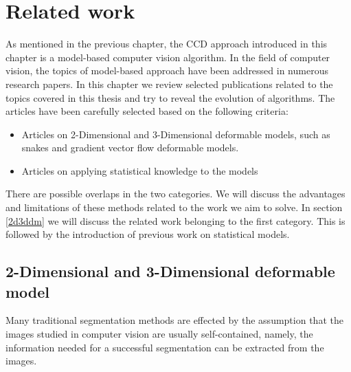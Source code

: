 \chapter{Related work}
\label{chapter:related}

As mentioned in the previous chapter, the
CCD approach introduced in this chapter is a model-based computer
vision algorithm. In the field of
computer vision, the topics of model-based approach have been addressed in numerous research papers.
In this chapter we review selected publications related to the topics
covered in this thesis and try to reveal the evolution of algorithms. The
articles have been carefully selected based on the following criteria:
\begin{itemize}
\item Articles on 2-Dimensional and 3-Dimensional deformable models,
  such as snakes and gradient vector flow deformable models\cite{xu2000gradient}.
\item Articles on applying statistical knowledge to the models
\end{itemize}
There are possible overlaps in the two categories. We will discuss the
advantages and limitations of these methods related to the work we aim
to solve. In section \ref{2d3ddm} we will discuss the related work
belonging to the first category. This is followed by the introduction
of previous work on statistical models.

\section{2-Dimensional and 3-Dimensional deformable model}
\label{sec:2d3ddm}
Many traditional segmentation methods are effected by the assumption that the
images studied in computer vision are usually self-contained, namely,
the information needed for a successful segmentation can be extracted
from the images.

